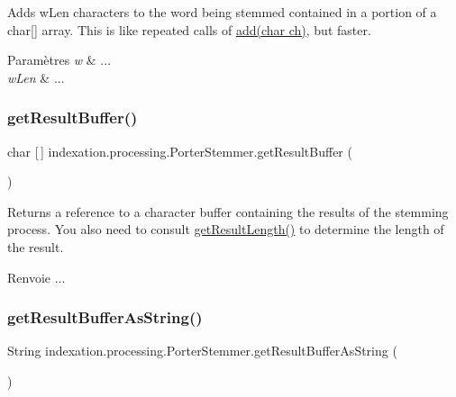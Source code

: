 Adds w\+Len characters to the word being stemmed contained in a portion of a char\mbox{[}\mbox{]} array. This is like repeated calls of \hyperlink{classindexation_1_1processing_1_1PorterStemmer_a707458b373324b9949c3e81b1f35161f}{add(char ch)}, but faster.


\begin{DoxyParams}{Paramètres}
{\em w} & ... \\
\hline
{\em w\+Len} & ... \\
\hline
\end{DoxyParams}
\mbox{\label{classindexation_1_1processing_1_1PorterStemmer_a8a549225c6b843fb730000e2d291913c}} 
\subsubsection{\texorpdfstring{get\+Result\+Buffer()}{getResultBuffer()}}
{\footnotesize\ttfamily char \mbox{[}$\,$\mbox{]} indexation.\+processing.\+Porter\+Stemmer.\+get\+Result\+Buffer (\begin{DoxyParamCaption}{ }\end{DoxyParamCaption})}

Returns a reference to a character buffer containing the results of the stemming process. You also need to consult \hyperlink{classindexation_1_1processing_1_1PorterStemmer_a1009cbe95a2ba30b6665848e8b0d6208}{get\+Result\+Length()} to determine the length of the result.

\begin{DoxyReturn}{Renvoie}
... 
\end{DoxyReturn}
\mbox{\label{classindexation_1_1processing_1_1PorterStemmer_a67d818639497e0dad6ced251e5562be8}} 
\subsubsection{\texorpdfstring{get\+Result\+Buffer\+As\+String()}{getResultBufferAsString()}}
{\footnotesize\ttfamily String indexation.\+processing.\+Porter\+Stemmer.\+get\+Result\+Buffer\+As\+String (\begin{DoxyParamCaption}{ }\end{DoxyParamCaption})}

